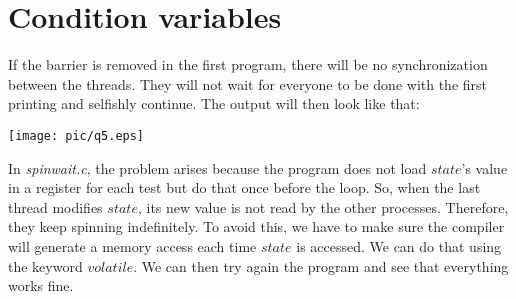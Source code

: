\chapter{Condition variables}

If the barrier is removed in the first program, there will be no synchronization between the threads. They will not wait for everyone to be done with the first printing and selfishly continue. The output will then look like that:
\begin{center}
	\texttt{[image: pic/q5.eps]}
\end{center}


In \textit{spinwait.c}, the problem arises because the program does not load $state$'s value in a register for each test but do that once before the loop. So, when the last thread modifies $state$, its new value is not read by the other processes. Therefore, they keep spinning indefinitely. To avoid this, we have to make sure the compiler will generate a memory access each time $state$ is accessed. We can do that using the keyword $volatile$. We can then try again the program and see that everything works fine. 
